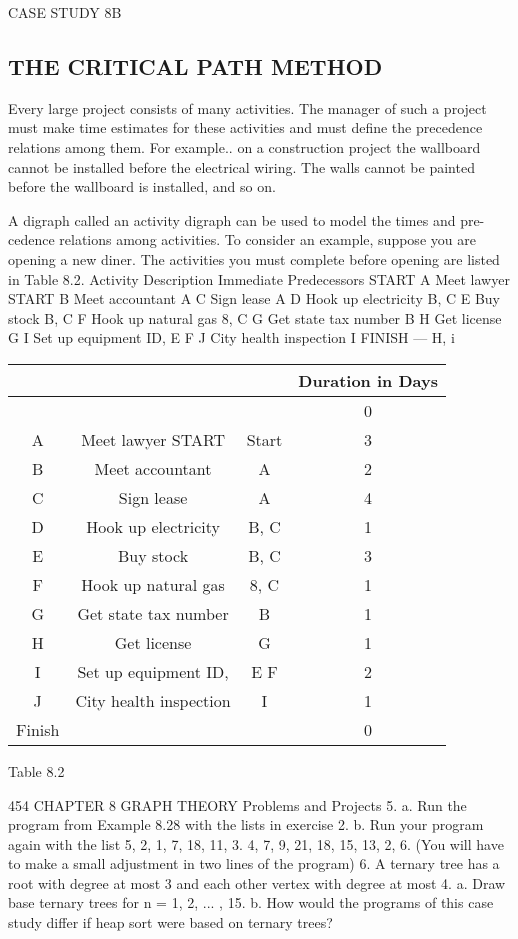 
CASE STUDY 8B 
\subsection{THE CRITICAL PATH METHOD}
Every large project consists of many activities. The manager of such a project must 
make time estimates for these activities and must define the precedence relations 
among them. For example.. on a construction project the wallboard cannot be installed 
before the electrical wiring. The walls cannot be painted before the wallboard is 
installed, and so on. 

A digraph called an activity digraph can be used to model the times and pre-
cedence relations among activities. To consider an example, suppose you are opening 
a new diner. The activities you must complete before opening are listed in Table 8.2. 
Activity 
Description Immediate Predecessors 
START 
A 	Meet lawyer START 
B 	Meet accountant 	A 
C 	Sign lease 	A 
D	 Hook up electricity 	B, C 
E 	Buy stock 	B, C 
F 	Hook up natural gas 	8, C 
G 	Get state tax number 	B 
H 	Get license	 G 
I 	Set up equipment ID, 	E F 
J 	City health inspection 	I 
FINISH — H, i 


\begin{tabular}{cccc}
	&		&		&	Duration 	in Days 	\\ \hline
	&		&		&	0		\\ \hline
A 	&	Meet lawyer START 	&	Start	&	3		\\ \hline
B 	&	Meet accountant 	&	A 	&	2		\\ \hline
C 	&	Sign lease 	&	A 	&	4		\\ \hline
D	&	 Hook up electricity 	&	B, C 	&	1		\\ \hline
E 	&	Buy stock 	&	B, C 	&	3		\\ \hline
F 	&	Hook up natural gas 	&	8, C 	&	1		\\ \hline
G 	&	Get state tax number 	&	B 	&	1		\\ \hline
H 	&	Get license	&	 G 	&	1		\\ \hline
I 	&	Set up equipment ID, 	&	E F 	&	2		\\ \hline
J 	&	City health inspection 	&	I 	&	1		\\ \hline
Finish	&		&		&	0		\\ \hline
\end{tabular}

Table 8.2 



454 CHAPTER 8 GRAPH THEORY 
Problems and Projects 5. a. Run the program from Example 8.28 with the lists in exercise 2. b. Run your program again with the list 5, 2, 1, 7, 18, 11, 3. 4, 7, 9, 21, 18, 15, 13, 2, 6. (You will have to make a small adjustment in two lines of the program) 6. A ternary tree has a root with degree at most 3 and each other vertex with degree at most 4. a. Draw base ternary trees for n = 1, 2, ... , 15. b. How would the programs of this case study differ if heap sort were based on ternary trees? 

